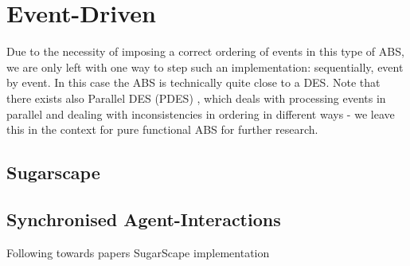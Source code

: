 \chapter{Event-Driven}
\label{ch:eventdriven}

Due to the necessity of imposing a correct ordering of events in this type of ABS, we are only left with one way to step such an implementation: sequentially, event by event. In this case the ABS is technically quite close to a DES. Note that there exists also Parallel DES (PDES) \cite{fujimoto_parallel_1990}, which deals with processing events in parallel and dealing with inconsistencies in ordering in different ways - we leave this in the context for pure functional ABS for further research.

\section{Sugarscape}

\section{Synchronised Agent-Interactions}
Following towards papers SugarScape implementation



